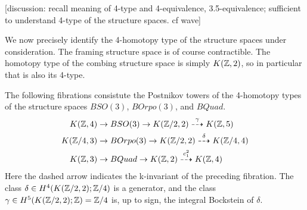 \documentclass{amsart}
\begin{document}
[discussion: recall meaning of 4-type and 4-equivalence, 3.5-equivalence; sufficient to understand 4-type of the structure spaces.  cf wave]

We now precisely identify the 4-homotopy type of the structure spaces under consideration.  The framing structure space is of course contractible.  The homotopy type of the combing structure space is simply $K(\mathbb Z,2)$, so in particular that is also its 4-type.

\begin{proposition}
The following fibrations consistute the Postnikov towers of the 4-homotopy types of the structure spaces $BSO(3)$, $BOrpo(3)$, and $BQuad$.
\begin{align}
K(\mathbb Z,4) \rightarrow & \; BSO(3) \rightarrow K(\mathbb Z/2,2) \overset{\gamma}{\dashrightarrow} K(\mathbb Z,5) \nonumber \\
K(\mathbb Z/4,3) \rightarrow & \; BOrpo(3) \rightarrow K(\mathbb Z/2,2) \overset{\delta}{\dashrightarrow} K(\mathbb Z/4,4) \nonumber \\
K(\mathbb Z,3) \rightarrow & \; BQuad \rightarrow K(\mathbb Z,2) \overset{c_1^2}{\dashrightarrow} K(\mathbb Z,4) \nonumber
\end{align}
\nid Here the dashed arrow indicates the k-invariant of the preceding fibration.  The class $\delta \in H^4(K(\mathbb Z/2,2);\mathbb Z/4)$ is a generator, and the class $\gamma \in H^5(K(\mathbb Z/2,2);\mathbb Z) = \mathbb Z/4$ is, up to sign, the integral Bockstein of $\delta$. 
\end{proposition}
\end{document}
